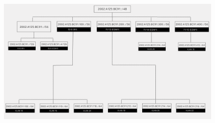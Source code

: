 \documentclass{article}
\begin{document}
\begin{figure}[H]
    \centering
    \includegraphics[width=12.5cm]{images/Horoscope Inc - IPv6.png}
\end{figure}

\printbibliography
\end{document}
